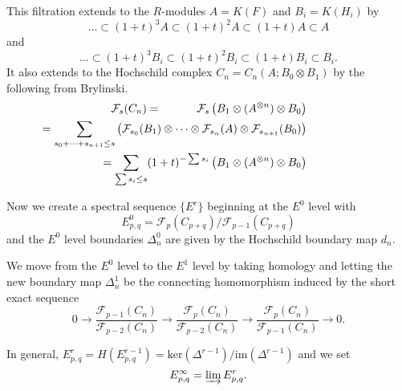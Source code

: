 \documentclass{slides}
\newcommand{\ot}{\otimes}
\begin{document}
\begin{slide}

This filtration extends to the $R$-modules $A=K(F)$ and $B_i=K(H_i)$ by
\[\dots \subset (1+t)^3 A \subset (1+t)^2 A \subset (1+t) A \subset A\] and
\[\dots \subset (1+t)^3 B_i \subset (1+t)^2 B_i \subset (1+t) B_i \subset B_i.\]
It also extends to the Hochschild complex $C_n = C_n(A;B_0 \ot B_1)$ by the
following from Brylinski.
\begin{eqnarray}
\mathcal{F}_s(C_n) & = & \mathcal{F}_s \left( B_1 \ot (A^{\ot n})
                         \ot B_0 \right) \nonumber \\
& & \hspace{-4cm} = \sum_{s_0 + \dots + s_{n+1} \leq s} \left( \mathcal{F}_{s_0}(B_1) \ot
      \dots \ot 
      \mathcal{F}_{s_n}(A) \ot \mathcal{F}_{s_{n+1}}(B_0) \right) \nonumber \\
& & \hspace{-4cm} = \sum_{\sum s_i \leq s} (1+t)^{-\sum s_i} \left( B_1 \ot (A^{\ot n})
      \ot B_0 \right) \nonumber
\end{eqnarray}
\end{slide}

\begin{slide}
Now we create a spectral sequence $\{ E^r \}$ beginning at the
$E^0$ level with
\[E^0_{p,q} = \mathcal{F}_{p}(C_{p+q}) / \mathcal{F}_{p-1}(C_{p+q})\]
and the $E^0$ level boundaries $\Delta^0_n$ are given by the Hochschild boundary
map $d_n$.

We move from the $E^0$ level to the $E^1$ level by taking
homology and letting the new boundary map $\Delta^1_n$ be the
connecting homomorphism induced by the short exact sequence
\[
0 \to \frac{\mathcal{F}_{p-1}(C_n)}{\mathcal{F}_{p-2}(C_n)} \to
\frac{\mathcal{F}_{p}(C_n)}{\mathcal{F}_{p-2}(C_n)} \to
\frac{\mathcal{F}_{p}(C_n)}{\mathcal{F}_{p-1}(C_n)} \to 0.
\]

In general,
 $E^r_{p,q} = H(E^{r-1}_{p,q}) = \mathrm{ker}(\Delta^{r-1})/\mathrm{im}(\Delta^{r-1})$ and
we set
\[
E^{\infty}_{p,q} = \varinjlim E^r_{p,q}.
\]
\end{slide}
\end{document}
